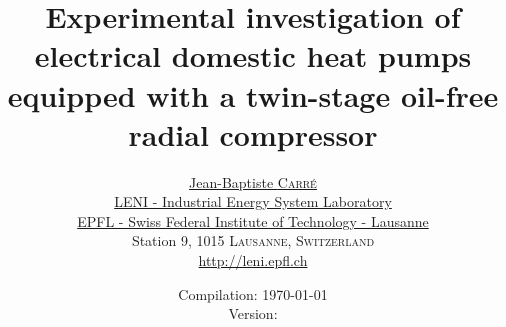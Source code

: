 \documentclass[english,10pt,a4paper,twoside,fleqn]{book}
\makeatletter
\newcommand{\vartitle}{Experimental investigation of electrical
  domestic heat pumps equipped with a twin-stage oil-free radial
  compressor}
\newcommand{\varauthor}{\href{http://people.epfl.ch/jean-baptiste.carre}{Jean-Baptiste
    \textsc{Carr\'e}}
  \href{mailto:jean-baptiste.carre@epfl.ch}{\Email}}
\newcommand{\varinstitute}{\href{http://leni.epfl.ch/}{LENI - Industrial Energy System Laboratory}\\
  \href{http://leni.epfl.ch/}{EPFL - Swiss Federal Institute of Technology - Lausanne}\\
  Station 9, 1015 \textsc{Lausanne}, \textsc{Switzerland}\\[3mm]
  \href{http://leni.epfl.ch/}{http://leni.epfl.ch}}
\newcommand{\vardate}{Compilation: \today\\
  Version: }
\makeatother
\begin{document}
\title{\vartitle}

\author{\varauthor\\[5mm]\varinstitute}

\date{\vardate}

\maketitle


\frontmatter






% 
% 

% 

\cleardoublepage
\newpage
{}
\tableofcontents

\cleardoublepage
\newpage
{}
\listoffigures

\cleardoublepage
\newpage
{}
\listoftables

\cleardoublepage
\newpage
{}
\printnomenclature

\cleardoublepage
\newpage
{}
\label{glossary}
\printglossary


\mainmatter

% 














\end{document}
